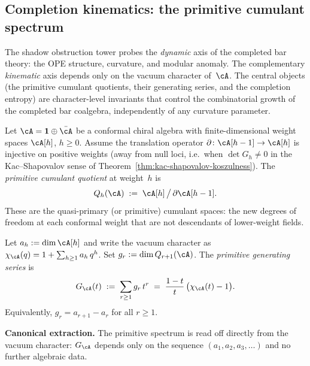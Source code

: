 \subsection{Completion kinematics: the primitive cumulant spectrum}
\label{subsec:completion-kinematics-cumulant}

The shadow obstruction tower probes the \emph{dynamic} axis of the
completed bar theory: the OPE structure, curvature, and modular
anomaly. The complementary
\emph{kinematic} axis depends only on the vacuum character
of~$\cA$. The central objects (the primitive cumulant quotients,
their generating series, and the completion entropy) are
character-level invariants that control the combinatorial growth
of the completed bar coalgebra, independently of any curvature
parameter.

\begin{definition}
\label{def:primitive-cumulant-quotient}

Let $\cA = \mathbf{1} \oplus \bar{\cA}$ be a conformal chiral
algebra with finite-dimensional weight spaces $\cA[h]$,
$h \geq 0$. Assume the translation operator
$\partial \colon \cA[h-1] \to \cA[h]$ is injective on positive
weights (away from null loci, i.e.\ when
$\det G_h \neq 0$ in the Kac--Shapovalov sense of
Theorem~\textup{\ref{thm:kac-shapovalov-koszulness}}).
The \emph{primitive cumulant quotient} at weight~$h$ is
\begin{equation}
\label{eq:primitive-cumulant-quotient}
Q_h(\cA) \;:=\; \cA[h]\,\big/\,\partial\cA[h-1].
\end{equation}
These are the quasi-primary (or primitive) cumulant spaces: the
new degrees of freedom at each conformal weight that are not
descendants of lower-weight fields.
\end{definition}

\begin{definition}
\label{def:primitive-generating-series}

Let $a_h := \dim \cA[h]$ and write the vacuum character as
$\chi_\cA(q) = 1 + \sum_{h \geq 1} a_h\, q^h$.
Set $g_r := \dim Q_{r+1}(\cA)$. The \emph{primitive generating
series} is
\begin{equation}
\label{eq:primitive-generating-series}
G_\cA(t) \;:=\; \sum_{r \geq 1} g_r\, t^r
\;=\; \frac{1-t}{t}\,\bigl(\chi_\cA(t) - 1\bigr).
\end{equation}
Equivalently, $g_r = a_{r+1} - a_r$ for all $r \geq 1$.

\smallskip\noindent\textbf{Canonical extraction.}
The primitive spectrum is read off directly from the vacuum
character: $G_\cA$ depends only on the sequence $(a_1, a_2,
a_3, \ldots)$ and no further algebraic data.
\end{definition}

